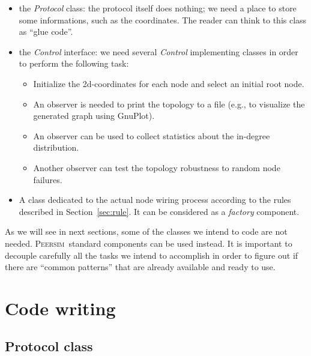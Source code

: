 \documentclass[a4paper,11pt]{article}
\newcommand{\id}[1]{{\scshape\small #1}}
\newcommand{\psim}{\id{Peersim}}
\begin{document}
\begin{itemize}

\item the \emph{Protocol} class: the protocol itself does nothing; we
  need a place to store some informations, such as the coordinates.
The reader can think to this class as ``glue code''.
 
\item the \emph{Control} interface: we need several \emph{Control}
  implementing classes in order to perform the following task:

\begin{itemize}

\item Initialize the 2d-coordinates for each node and select an
  initial root node.

\item An observer is needed to print the topology to a file (e.g., to
  visualize the generated graph using GnuPlot).

\item An observer can be used to collect statistics about the
  in-degree distribution.

\item Another observer can test the topology robustness to random node
  failures.

\end{itemize}

\item A class dedicated to the actual node wiring process according to
  the rules described in Section~\ref{sec:rule}. It can be considered
  as a \emph{factory} component.

\end{itemize}

As we will see in next sections, some of the classes we intend to code
are not needed. \psim~standard components can be used instead. It is
important to decouple carefully all the tasks we intend to accomplish in
order to figure out if there are ``common patterns'' that are already
available and ready to use.


\section{Code writing}

\subsection{Protocol class}
\end{document}
